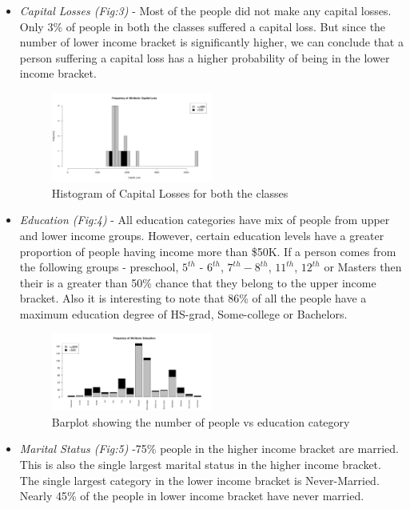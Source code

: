 \begin{itemize}
\begin{figure}[h]
		\end{figure}
	\item \emph{Capital Losses (Fig:3)} - Most of the people did not make any capital losses. Only 3\% of people in both the classes suffered a capital loss. But since the number of lower income bracket is significantly higher, we can conclude that a person suffering a capital loss has a higher probability of being in the lower income bracket.
		\begin{figure}[h]
			\label{fig:capital-loss-hist}
			\caption{Histogram of Capital Losses for both the classes}
			\centering
			\includegraphics[width=0.5\textwidth]{images/capital_loss-hist.jpg}
		\end{figure}
	\item \emph{Education (Fig:4)} - All education categories have mix of people from upper and lower income groups. However, certain education levels have a greater proportion of people having income more than \$50K. If a person comes from the following groups - preschool, $5^{th}$ - $6^{th}$, $7^{th} - 8^{th}$, $11^{th}$, $12^{th}$ or Masters then their is a greater than 50\% chance that they belong to the upper income bracket. Also it is interesting to note that 86\% of all the people have a maximum education degree of HS-grad, Some-college or Bachelors.
		 \begin{figure}[h]
			\label{fig:education-bar}
			\caption{Barplot showing the number of people vs education category}
			\centering
			\includegraphics[width=0.5\textwidth]{images/education-bar.jpg}
		\end{figure}
	\item \emph{Marital Status (Fig:5)} -75\% people in the higher income bracket are married. This is also the single largest marital status in the higher income bracket. The single largest category in the lower income bracket is Never-Married. Nearly 45\% of the people  in lower income bracket have never married.

\end{itemize}
